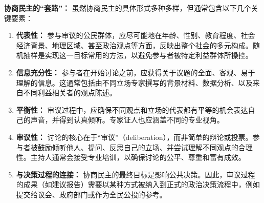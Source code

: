 \documentclass[UTF8, 10pt]{ctexbook}
\begin{document}
\textbf{协商民主的“套路”：}
虽然协商民主的具体形式多种多样，但通常包含以下几个关键要素：
\begin{enumerate}
    \item  \textbf{代表性：} 参与审议的公民群体，应尽可能地在年龄、性别、教育程度、社会经济背景、地理区域、甚至政治观点等方面，反映出整个社会的多元构成。随机抽样是实现这一目标常用的方法，以避免参与者被特定利益群体所操控。
    \item  \textbf{信息充分性：} 参与者在开始讨论之前，应获得关于议题的全面、客观、易于理解的信息。这通常包括由不同立场专家撰写的背景材料、数据分析、以及来自不同利益相关者的观点陈述。
    \item  \textbf{平衡性：} 审议过程中，应确保不同观点和立场的代表都有平等的机会表达自己的声音，并得到认真倾听。专家证人也应涵盖不同的专业视角。
    \item  \textbf{审议性：} 讨论的核心在于“审议”（deliberation），而非简单的辩论或投票。参与者被鼓励倾听他人、提问、反思自己的立场、并尝试理解不同观点的合理性。主持人通常会接受专业培训，以确保讨论的公平、尊重和富有成效。
    \item  \textbf{与决策过程的连接：} 协商民主的最终目标是影响公共决策。因此，审议过程的成果（如建议报告）需要以某种方式被纳入到正式的政治决策流程中，例如提交给议会、政府部门或作为全民公投的参考。
\end{enumerate}
\end{document}
